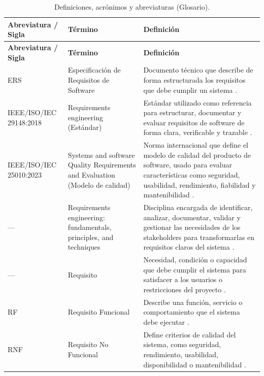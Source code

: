 \documentclass[journal,onecolumn]{IEEEtran}
\begin{document}
	\begin{longtable}{|p{2.2cm}|p{3.3cm}|p{9.5cm}|}
		\caption{Definiciones, acrónimos y abreviaturas (Glosario).} \label{tab:glosario_ers} \\
		\hline
		\textbf{Abreviatura / Sigla} & \textbf{Término} & \textbf{Definición} \\
		\hline
		\endfirsthead
		\hline
		\textbf{Abreviatura / Sigla} & \textbf{Término} & \textbf{Definición} \\
		\hline
		\endhead
		\hline
		\endfoot
		\hline
		\endlastfoot
		
		ERS & Especificación de Requisitos de Software & Documento técnico que describe de forma estructurada los requisitos que debe cumplir un sistema \cite{atoum2021}. \\ \hline
		
		IEEE/ISO/IEC 29148:2018 & Requirements engineering (Estándar) & Estándar utilizado como referencia para estructurar, documentar y evaluar requisitos de software de forma clara, verificable y trazable \cite{iso29148}. \\ \hline
		
		IEEE/ISO/IEC 25010:2023 & Systems and software Quality Requirements and Evaluation (Modelo de calidad) & Norma internacional que define el modelo de calidad del producto de software, usado para evaluar características como seguridad, usabilidad, rendimiento, fiabilidad y mantenibilidad \cite{iso25010}. \\ \hline
		
		--- & Requirements engineering: fundamentals, principles, and techniques & Disciplina encargada de identificar, analizar, documentar, validar y gestionar las necesidades de los stakeholders para transformarlas en requisitos claros del sistema \cite{pohl2025}. \\ \hline
		
		--- & Requisito & Necesidad, condición o capacidad que debe cumplir el sistema para satisfacer a los usuarios o restricciones del proyecto \cite{gobov2023}. \\ \hline
		
		RF & Requisito Funcional & Describe una función, servicio o comportamiento que el sistema debe ejecutar \cite{said2026}. \\ \hline
		
		RNF & Requisito No Funcional & Define criterios de calidad del sistema, como seguridad, rendimiento, usabilidad, disponibilidad o mantenibilidad \cite{bhar2026}. \\ \hline
		

\end{longtable}
\end{document}
